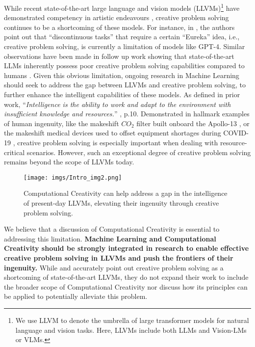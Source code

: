 While recent state-of-the-art large language and vision models (LLVMs)\footnote{We use LLVM to denote the umbrella of large transformer models for natural language and vision tasks. Here, LLVMs include both LLMs and Vision-LMs or VLMs.} have demonstrated competency in artistic endeavours \cite{rombach2021high,copet2023simple}, creative problem solving continues to be a shortcoming of these models. For instance, in \cite{bubeck2023sparks}, the authors point out that ``discontinuous tasks'' that require a certain ``Eureka'' idea, i.e., creative problem solving, is currently a limitation of models like GPT-4. Similar observations have been made in follow up work showing that state-of-the-art LLMs inherently possess poor creative problem solving capabilities compared to humans \cite{tian2023macgyver}. Given this obvious limitation, ongoing research in Machine Learning should seek to address the gap between LLVMs and creative problem solving, to further enhance the intelligent capabilities of these models. As defined in prior work, ``\textit{Intelligence is the ability to work and adapt to the environment with insufficient knowledge and resources.}'' \cite{pennachin2007contemporary}, p.10. Demonstrated in hallmark examples of human ingenuity, like the makeshift $CO_2$ filter built onboard the Apollo-13 \cite{cass2005apollo}, or the makeshift medical devices used to offset equipment shortages during COVID-19 \cite{turner2020thinking}, creative problem solving is especially important when dealing with resource-critical scenarios. However, such an exceptional degree of creative problem solving remains beyond the scope of LLVMs today.

\begin{figure}[t]
	\centering
\texttt{[image: imgs/Intro\_img2.png]}
	\captionsetup{width=\linewidth}
	\caption{Computational Creativity can help address a gap in the intelligence of present-day LLVMs, elevating their ingenuity through creative problem solving.}
	\label{fig:intro-img}
\end{figure}




We believe that a discussion of Computational Creativity is essential to addressing this limitation. \textbf{Machine Learning and Computational Creativity should be strongly integrated in research to enable effective creative problem solving in LLVMs and push the frontiers of their ingenuity.} While \cite{bubeck2023sparks} and \cite{tian2023macgyver} accurately point out creative problem solving as a shortcoming of state-of-the-art LLVMs, they do not expand their work to include the broader scope of Computational Creativity nor discuss how its principles can be applied to potentially alleviate this problem.


